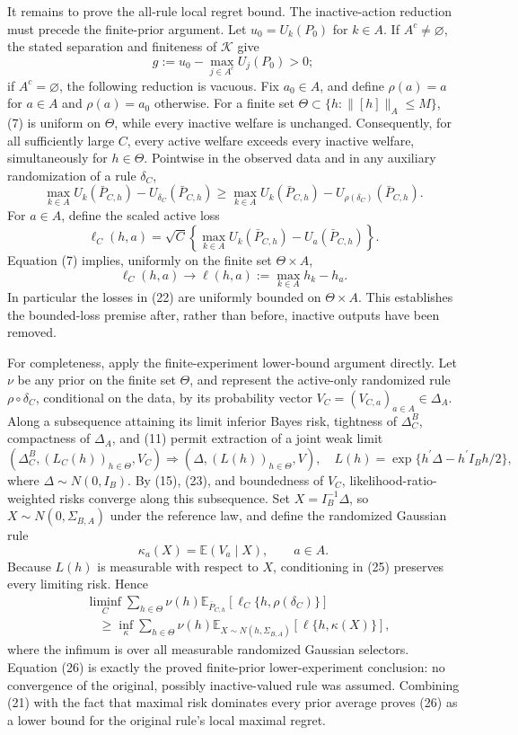 It remains to prove the all-rule local regret bound.  The inactive-action reduction must precede the finite-prior argument.  Let \(u_0=U_k(P_0)\) for \(k\in A\).  If \(A^c\neq\varnothing\), the stated separation and finiteness of \(\mathcal K\) give
\[
g:=u_0-\max_{j\in A^c}U_j(P_0)>0;
\tag{20}
\]
if \(A^c=\varnothing\), the following reduction is vacuous.  Fix \(a_0\in A\), and define \(\rho(a)=a\) for \(a\in A\) and \(\rho(a)=a_0\) otherwise.  For a finite set \(\Theta\subset\{h:\lVert[h]\rVert_A\leq M\}\), (7) is uniform on \(\Theta\), while every inactive welfare is unchanged.  Consequently, for all sufficiently large \(C\), every active welfare exceeds every inactive welfare, simultaneously for \(h\in\Theta\).  Pointwise in the observed data and in any auxiliary randomization of a rule \(\delta_C\),
\[
\max_{k\in A}U_k(\bar P_{C,h})-U_{\delta_C}(\bar P_{C,h})
\geq
\max_{k\in A}U_k(\bar P_{C,h})-U_{\rho(\delta_C)}(\bar P_{C,h}).
\tag{21}
\]
For \(a\in A\), define the scaled active loss
\[
\ell_C(h,a)=\sqrt C\left\{\max_{k\in A}U_k(\bar P_{C,h})-U_a(\bar P_{C,h})\right\}.
\tag{22}
\]
Equation (7) implies, uniformly on the finite set \(\Theta\times A\),
\[
\ell_C(h,a)\longrightarrow
\ell(h,a):=\max_{k\in A}h_k-h_a.
\tag{23}
\]
In particular the losses in (22) are uniformly bounded on \(\Theta\times A\).  This establishes the bounded-loss premise after, rather than before, inactive outputs have been removed.

For completeness, apply the finite-experiment lower-bound argument directly.  Let \(\nu\) be any prior on the finite set \(\Theta\), and represent the active-only randomized rule \(\rho\circ\delta_C\), conditional on the data, by its probability vector \(V_C=(V_{C,a})_{a\in A}\in\Delta_A\).  Along a subsequence attaining its limit inferior Bayes risk, tightness of \(\Delta_C^B\), compactness of \(\Delta_A\), and (11) permit extraction of a joint weak limit
\[
\left(\Delta_C^B,(L_C(h))_{h\in\Theta},V_C\right)
\Rightarrow
\left(\Delta,(L(h))_{h\in\Theta},V\right),
\quad
L(h)=\exp\{h^{\prime}\Delta-h^{\prime}I_Bh/2\},
\tag{24}
\]
where \(\Delta\sim N(0,I_B)\).  By (15), (23), and boundedness of \(V_C\), likelihood-ratio-weighted risks converge along this subsequence.  Set \(X=I_B^{-1}\Delta\), so \(X\sim N(0,\Sigma_{B,A})\) under the reference law, and define the randomized Gaussian rule
\[
\kappa_a(X)=\mathbb E(V_a\mid X),\qquad a\in A.
\tag{25}
\]
Because \(L(h)\) is measurable with respect to \(X\), conditioning in (25) preserves every limiting risk.  Hence
\[
\begin{split}
&\liminf_C\sum_{h\in\Theta}\nu(h)
\mathbb E_{\bar P_{C,h}}\!\left[\ell_C\{h,\rho(\delta_C)\}\right]\\
&\quad\geq
\inf_{\kappa}\sum_{h\in\Theta}\nu(h)
\mathbb E_{X\sim N(h,\Sigma_{B,A})}[\ell\{h,\kappa(X)\}],
\end{split}
\tag{26}
\]
where the infimum is over all measurable randomized Gaussian selectors.  Equation (26) is exactly the proved finite-prior lower-experiment conclusion: no convergence of the original, possibly inactive-valued rule was assumed.  Combining (21) with the fact that maximal risk dominates every prior average proves (26) as a lower bound for the original rule's local maximal regret.

